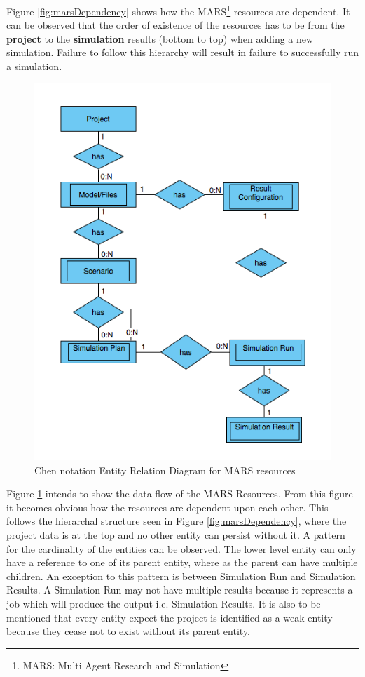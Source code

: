         Figure \ref{fig:marsDependency} shows how the MARS\footnote{MARS: Multi Agent Research and Simulation} 
        resources are dependent. It can be observed
        that the order of existence of the resources has to be from the \textbf{project} to the \textbf{simulation} results 
        (bottom to top) when adding a new simulation. Failure to follow this hierarchy will result in failure to
        successfully run a simulation.

        \begin{figure}[H]
            \centering \includegraphics[scale=0.6]{grafiken/ERMars.png}
            \caption{Chen notation Entity Relation Diagram for MARS resources}
            \label{fig:ERMars}
        \end{figure}
        
        Figure \ref{fig:ERMars} intends to show the data flow of the MARS Resources. From this figure it becomes obvious 
        how the resources are dependent upon each other. This follows the hierarchal structure seen in Figure \ref{fig:marsDependency},
        where the project data is at the top and no other entity can persist without it. A pattern for the cardinality of the entities can be observed.
        The lower level entity can only have a reference to one of its parent entity, where as the parent can have multiple children. An exception to this
        pattern is between Simulation Run and Simulation Results. A Simulation Run may not have multiple results because it represents a job which will produce
        the output i.e. Simulation Results. It is also to be mentioned that every entity expect the project is identified as a weak entity because they cease not 
        to exist without its parent entity. 

